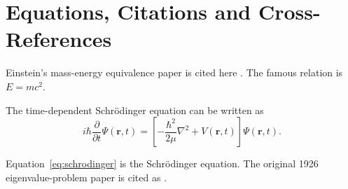 \documentclass[12pt,a4paper]{article}
\begin{document}
\section{Equations, Citations and Cross-References}

Einstein's mass-energy equivalence paper is cited here
\citep{einstein1905}. The famous relation is \(E=mc^2\).

The time-dependent Schrödinger equation can be written as
\begin{equation}
i\hbar\frac{\partial}{\partial t}\Psi(\mathbf{r},t)
=
\left[
-\frac{\hbar^2}{2\mu}\nabla^2+V(\mathbf{r},t)
\right]\Psi(\mathbf{r},t).
\label{eq:schrodinger}
\end{equation}

Equation~\eqref{eq:schrodinger} is the Schrödinger equation.
The original 1926 eigenvalue-problem paper is cited as
\citet{schrodinger1926}.



\end{document}
